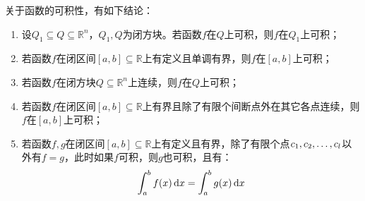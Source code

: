 \begin{theorem}\label{theo:RiemannIntegrable}
	关于函数的可积性，有如下结论：
	\begin{enumerate}
		\item 设$Q_1\subseteq Q\subseteq\mathbb{R}^{n}$，$Q_1,Q$为闭方块。若函数$f$在$Q$上可积，则$f$在$Q_1$上可积；
		\item 若函数$f$在闭区间$[a,b]\subseteq\mathbb{R}$上有定义且单调有界，则$f$在$[a,b]$上可积；
		\item 若函数$f$在闭方块$Q\subseteq\mathbb{R}^n$上连续，则$f$在$Q$上可积；
		\item 若函数$f$在闭区间$[a,b]\subseteq\mathbb{R}$上有界且除了有限个间断点外在其它各点连续，则$f$在$[a,b]$上可积；
		\item 若函数$f,g$在闭区间$[a,b]\subseteq\mathbb{R}$上有定义且有界，除了有限个点$c_1, c_2, \dots, c_{l}$以外有$f=g$，此时如果$f$可积，则$g$也可积，且有：
		\begin{equation*}
			\int_{a}^bf(x)\mathop{}\!\mathrm{d} x=\int_{a}^bg(x)\mathop{}\!\mathrm{d} x
		\end{equation*}
	\end{enumerate}
\end{theorem}
